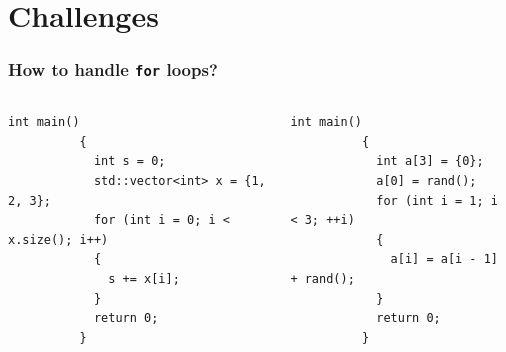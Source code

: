 \documentclass{beamer}
\begin{document}
\section{Challenges}

\begin{frame}[fragile]
  \frametitle{How to handle \texttt{for} loops?}

  \begin{columns}
    \begin{column}{0.5\textwidth}
      \begin{center}
        \begin{lstlisting}[style=cppStyle,basicstyle=\ttfamily\fontsize{7pt}{7pt}\selectfont]
          int main()
          {
            int s = 0;
            std::vector<int> x = {1, 2, 3};
            for (int i = 0; i < x.size(); i++)
            {
              s += x[i];
            }
            return 0;
          }
        \end{lstlisting}
      \end{center}
    \end{column}
    \begin{column}{0.5\textwidth}
      \begin{center}
        \begin{lstlisting}[style=cppStyle,basicstyle=\ttfamily\fontsize{7pt}{7pt}\selectfont]
          int main()
          {
            int a[3] = {0};
            a[0] = rand();
            for (int i = 1; i < 3; ++i)
            {
              a[i] = a[i - 1] + rand();
            }
            return 0;
          }
        \end{lstlisting}
      \end{center}
    \end{column}
  \end{columns}
\end{frame}
\end{document}

